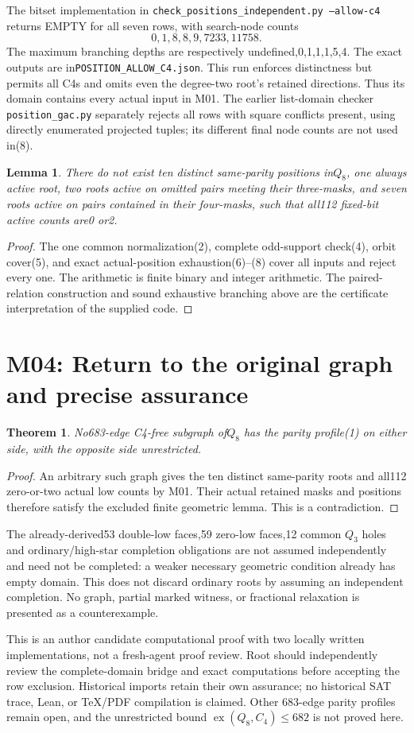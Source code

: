 \documentclass{article}
\newtheorem{lemma}{Lemma}\newtheorem{theorem}{Theorem}
\begin{document}
The bitset implementation in
\texttt{check\_positions\_independent.py --allow-c4} returns EMPTY
for all seven rows, with search-node counts
\[
                       0,1,8,8,9,7233,11758.                    \tag{8}
\]
The maximum branching depths are respectively undefined,0,1,1,1,5,4.
The exact outputs are in\texttt{POSITION\_ALLOW\_C4.json}.
This run enforces distinctness but permits all C4s and omits even the
degree-two root's retained directions. Thus its domain contains every
actual input in M01. The earlier list-domain checker
\texttt{position\_gac.py} separately rejects all rows with square
conflicts present, using directly enumerated projected tuples;
its different final node counts are not used in(8).

\begin{lemma}
There do not exist ten distinct same-parity positions in$Q_8$, one
always active root, two roots active on omitted pairs meeting their
three-masks, and seven roots active on pairs contained in their
four-masks, such that all112 fixed-bit active counts are0 or2.
\end{lemma}
\begin{proof}
The one common normalization(2), complete odd-support check(4),
orbit cover(5), and exact actual-position exhaustion(6)--(8) cover
all inputs and reject every one. The arithmetic is finite binary and
integer arithmetic. The paired-relation construction and sound exhaustive
branching above are the certificate interpretation of the supplied code.
\end{proof}

\section{M04: Return to the original graph and precise assurance}
\begin{theorem}
No683-edge C4-free subgraph of$Q_8$ has the parity profile(1) on
either side, with the opposite side unrestricted.
\end{theorem}
\begin{proof}
An arbitrary such graph gives the ten distinct same-parity roots and
all112 zero-or-two actual low counts by M01. Their actual retained
masks and positions therefore satisfy the excluded finite geometric
lemma. This is a contradiction.
\end{proof}
The already-derived53 double-low faces,59 zero-low faces,12 common
$Q_3$ holes and ordinary/high-star completion obligations are not assumed
independently and need not be completed: a weaker necessary geometric
condition already has empty domain. This does not discard ordinary
roots by assuming an independent completion. No graph, partial marked
witness, or fractional relaxation is presented as a counterexample.

This is an author candidate computational proof with two locally written
implementations, not a fresh-agent proof review. Root should independently
review the complete-domain bridge and exact computations before accepting
the row exclusion. Historical imports retain their own assurance; no
historical SAT trace, Lean, or TeX/PDF compilation is claimed. Other
683-edge parity profiles remain open, and the unrestricted bound
$\operatorname{ex}(Q_8,C_4)\le682$ is not proved here.
\end{document}
